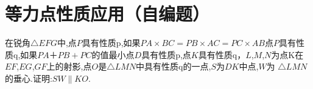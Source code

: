 \documentclass[]{article}
\title{}
\author{}
\date{}
\begin{document}
\maketitle
\section{等力点性质应用（自编题）}{
在锐角$ \triangle EFG $中,点$ P $具有性质p,如果$ PA \times BC =PB \times AC =PC \times AB $\p 点$ P $具有性质q,如果$ PA＋PB+PC $的值最小\p 点$ D $具有性质p,点$ K $具有性质q，$ L $,$ M $,$ N $为点K在$ EF $,$ EG $,$ GF $上的射影,点$ O $是$ \triangle LMN $中具有性质q的一点,$ S $为$ DK $中点,$ W为$  $\triangle LMN $的垂心.证明:$ SW \parallel KO $.
}
\end{document}
